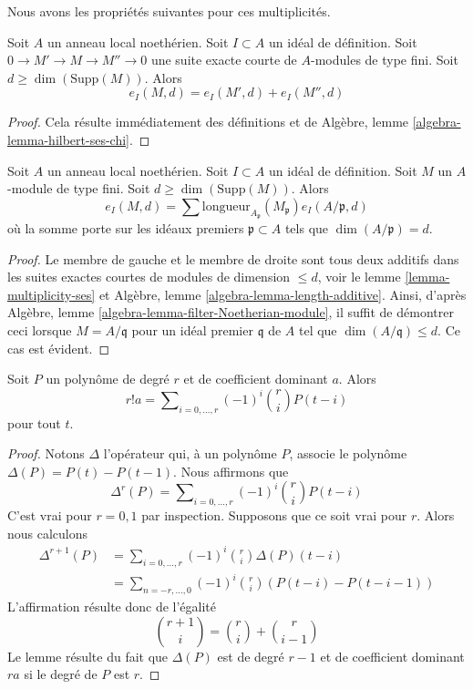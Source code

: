 \noindent
Nous avons les propriétés suivantes pour ces multiplicités.

\begin{lemma}
\label{lemma-multiplicity-ses}
Soit $A$ un anneau local noethérien. Soit $I \subset A$ un idéal de
définition. Soit $0 \to M' \to M \to M'' \to 0$ une suite exacte courte
de $A$-modules de type fini. Soit $d \geq \dim(\text{Supp}(M))$. Alors
$$
e_I(M, d) = e_I(M', d) + e_I(M'', d)
$$
\end{lemma}

\begin{proof}
Cela résulte immédiatement des définitions et de
Algèbre, lemme \ref{algebra-lemma-hilbert-ses-chi}.
\end{proof}

\begin{lemma}
\label{lemma-multiplicity-as-a-sum}
Soit $A$ un anneau local noethérien. Soit $I \subset A$ un idéal de
définition. Soit $M$ un $A$-module de type fini. Soit $d \geq \dim(\text{Supp}(M))$.
Alors
$$
e_I(M, d) =
\sum \text{longueur}_{A_\mathfrak p}(M_\mathfrak p) e_I(A/\mathfrak p, d)
$$
où la somme porte sur les idéaux premiers $\mathfrak p \subset A$ tels que
$\dim(A/\mathfrak p) = d$.
\end{lemma}

\begin{proof}
Le membre de gauche et le membre de droite sont tous deux additifs dans les suites
exactes courtes de modules de dimension $\leq d$, voir
le lemme \ref{lemma-multiplicity-ses} et
Algèbre, lemme \ref{algebra-lemma-length-additive}.
Ainsi, d'après Algèbre, lemme \ref{algebra-lemma-filter-Noetherian-module},
il suffit de démontrer ceci lorsque $M = A/\mathfrak q$ pour un
idéal premier $\mathfrak q$ de $A$ tel que $\dim(A/\mathfrak q) \leq d$.
Ce cas est évident.
\end{proof}

\begin{lemma}
\label{lemma-leading-coefficient}
Soit $P$ un polynôme de degré $r$ et de coefficient dominant $a$.
Alors
$$
r! a = \sum\nolimits_{i = 0, \ldots, r} (-1)^i{r \choose i} P(t - i)
$$
pour tout $t$.
\end{lemma}

\begin{proof}
Notons $\Delta$ l'opérateur qui, à un polynôme $P$, associe
le polynôme $\Delta(P) = P(t) - P(t - 1)$. Nous affirmons que
$$
\Delta^r(P) = \sum\nolimits_{i = 0, \ldots, r} (-1)^i {r \choose i} P(t - i)
$$
C'est vrai pour $r = 0, 1$ par inspection. Supposons que ce soit vrai pour $r$.
Alors nous calculons
\begin{align*}
\Delta^{r + 1}(P)
& =
\sum\nolimits_{i = 0, \ldots, r} (-1)^i {r \choose i} \Delta(P)(t - i) \\
& =
\sum\nolimits_{n = -r, \ldots, 0} (-1)^i {r \choose i}
(P(t - i) - P(t - i - 1))
\end{align*}
L'affirmation résulte donc de l'égalité
$$
{r + 1 \choose i} = {r \choose i} + {r \choose i - 1}
$$
Le lemme résulte du fait que $\Delta(P)$ est de degré $r - 1$
et de coefficient dominant $ra$ si le degré de $P$ est $r$.
\end{proof}

